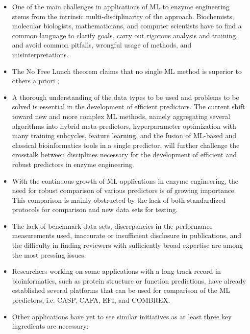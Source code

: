 \documentclass[12pt]{article}
\begin{document}
\begin{itemize}

\item One of the main challenges in applications of ML to enzyme engineering stems from the intrinsic multi-disciplinarity of the approach. Biochemists, molecular biologists, mathematicians, and computer scientists have to ﬁnd a common language to clarify goals, carry out rigorous analysis and training, and avoid common pitfalls, wrongful usage of methods, and misinterpretations.

\item The No Free Lunch theorem \cite{85} claims that no single ML method is superior to others a priori \cite{86}; 


\item A thorough understanding of the data types to be used and problems to be solved is essential in the development of efficient predictors. The current shift toward new and more complex ML methods, namely aggregating several algorithms into hybrid meta-predictors, hyperparameter optimization with many training subcycles, feature learning, and the fusion of ML-based and classical bioinformatics tools in a single predictor, will further challenge the crosstalk between disciplines necessary for the development of efficient and robust predictors in enzyme engineering.

\item With the continuous growth of ML applications in enzyme engineering, the need for robust comparison of various predictors is of growing importance. This comparison is mainly obstructed by the lack of both standardized protocols for comparison and new data sets for testing. 

\item The lack of benchmark data sets, discrepancies in the performance measurements used, inaccurate or insuﬃcient disclosure in publications, and the diﬃculty in ﬁnding reviewers with suﬃciently broad expertise \cite{87} are among the most pressing issues. 

\item Researchers working on some applications with a long track record in bioinformatics, such as protein structure or function predictions, have already established several platforms that can be used for comparison of the ML predictors, i.e. CASP, CAFA, EFI, and COMBREX.

\item Other applications have yet to see similar initiatives as at least three key ingredients are necessary: 


\end{itemize}
\end{document}
